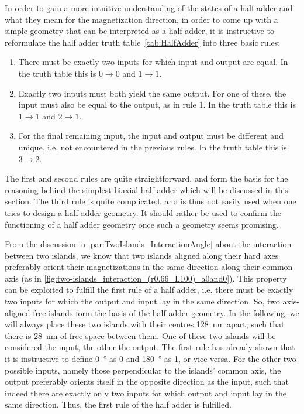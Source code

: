\documentclass[11pt,a4paper,english]{article}
\begin{document}
In order to gain a more intuitive understanding of the states of a half adder and what they mean for the magnetization direction, in order to come up with a simple geometry that can be interpreted as a half adder, it is instructive to reformulate the half adder truth table~\ref{tab:HalfAdder} into three basic rules:
\begin{enumerate}
    \item There must be exactly two inputs for which input and output are equal. In the truth table this is $0\rightarrow0$ and $1\rightarrow1$.
    \item Exactly two inputs must both yield the same output. For one of these, the input must also be equal to the output, as in rule 1. In the truth table this is $1\rightarrow1$ and $2\rightarrow1$.
    \item For the final remaining input, the input and output must be different and unique, i.e. not encountered in the previous rules. In the truth table this is $3\rightarrow2$.
\end{enumerate}
The first and second rules are quite straightforward, and form the basis for the reasoning behind the simplest biaxial half adder which will be discussed in this section. The third rule is quite complicated, and is thus not easily used when one tries to design a half adder geometry. It should rather be used to confirm the functioning of a half adder geometry once such a geometry seems promising. \par
From the discussion in \cref{par:TwoIslands_InteractionAngle} about the interaction between two islands, we know that two islands aligned along their hard axes preferably orient their magnetizations in the same direction along their common axis (as in \cref{fig:two-islands_interaction_(r0.66_L100)_a0and0}). This property can be exploited to fulfill the first rule of a half adder, i.e. there must be exactly two inputs for which the output and input lay in the same direction. So, two axis-aligned free islands form the basis of the half adder geometry. In the following, we will always place these two islands with their centres \SI{128}{\nano\metre} apart, such that there is \SI{28}{\nano\metre} of free space between them. One of these two islands will be considered the input, the other the output. The first rule has already shown that it is instructive to define \SI{0}{\degree} as 0 and \SI{180}{\degree} as 1, or vice versa. For the other two possible inputs, namely those perpendicular to the islands' common axis, the output preferably orients itself in the opposite direction as the input, such that indeed there are exactly only two inputs for which output and input lay in the same direction. Thus, the first rule of the half adder is fulfilled. \par
\end{document}
